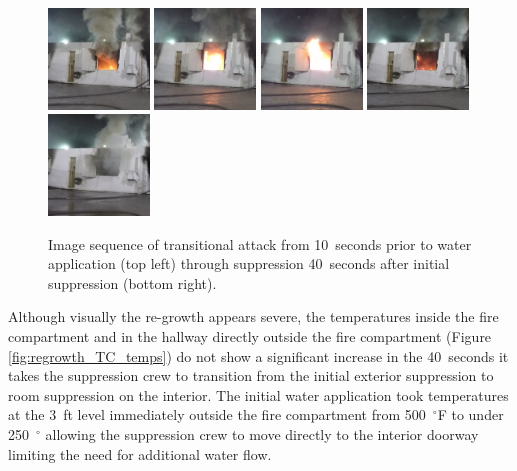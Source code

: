 \documentclass[12pt,oneside]{book}
\begin{document}
\begin{figure}[H]
\includegraphics[width=0.24\textwidth]{../0_Images/Tactical_Considerations/Regrowth/20_Sec_Post}
\includegraphics[width=0.24\textwidth]{../0_Images/Tactical_Considerations/Regrowth/25_Sec_Post}
\includegraphics[width=0.24\textwidth]{../0_Images/Tactical_Considerations/Regrowth/30_Sec_Post}
\includegraphics[width=0.24\textwidth]{../0_Images/Tactical_Considerations/Regrowth/35_Sec_Post}
\includegraphics[width=0.24\textwidth]{../0_Images/Tactical_Considerations/Regrowth/40_Sec_Post}
\caption[Exterior Suppression Regrowth Images]{Image sequence of transitional attack from 10~seconds prior to water application (top left) through suppression 40~seconds after initial suppression (bottom right).}
\label{fig:regrowth_TC_image_sequence}
\end{figure}

Although visually the re-growth appears severe, the temperatures inside the fire compartment and in the hallway directly outside the fire compartment (Figure \ref{fig:regrowth_TC_temps}) do not show a significant increase in the 40~seconds it takes the suppression crew to transition from the initial exterior suppression to room suppression on the interior. The initial water application took temperatures at the 3~ft level immediately outside the fire compartment from 500~$^\circ$F to under 250~$^\circ$ allowing the suppression crew to move directly to the interior doorway limiting the need for additional water flow.
\end{document}
